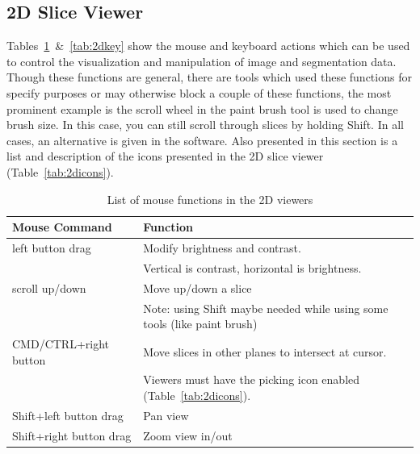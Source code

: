 \documentclass[fleqn,11pt,openany]{book}
\begin{document}
\subsection{2D Slice Viewer}

Tables~\ref{tab:2dmouse}~\&~\ref{tab:2dkey}  show the mouse and keyboard actions which can be used to control the visualization and manipulation of image and segmentation data.
Though these functions are general, there are tools which used these functions for specify purposes or may otherwise block a couple of these functions, the most prominent example is the scroll wheel in the paint brush tool is used to change brush size.
In this case, you can still scroll through slices by holding Shift.
In all cases, an alternative is given in the software.
Also presented in this section is a list and description of the icons presented in the 2D slice viewer (Table~\ref{tab:2dicons}).

\begin{table}[h!]
\label{tab:2dmouse}
\caption{List of mouse functions in the 2D viewers}
\begin{tabular}{|l|l|}
\hline
{\bf Mouse Command} & {\bf Function}\\
\hline
left button drag & Modify brightness and contrast.  \\ &Vertical is contrast, horizontal is brightness. \\
\hline 
scroll up/down & Move up/down a slice\\ &Note: using Shift maybe needed while using some tools (like paint brush)\\
\hline
CMD/CTRL+right button & Move slices in other planes to intersect at cursor.\\  &Viewers must have the picking icon enabled (Table~\ref{tab:2dicons}).\\
\hline
Shift+left button drag & Pan view\\
Shift+right button drag & Zoom view in/out\\
\hline
\end{tabular}
\end{table}
\end{document}

